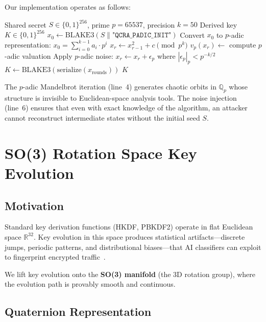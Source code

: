 \documentclass[11pt,a4paper]{article}
\begin{document}
Our implementation operates as follows:

\begin{algorithm}[H]
\caption{P-Adic Key Derivation}
\label{alg:padic}
\begin{algorithmic}[1]
\Require Shared secret $S \in \{0,1\}^{256}$, prime $p = 65537$, precision $k = 50$
\Ensure Derived key $K \in \{0,1\}^{256}$
\State $x_0 \gets \text{BLAKE3}(S \| \texttt{"QCRA\_PADIC\_INIT"})$
\State Convert $x_0$ to $p$-adic representation: $x_0 = \sum_{i=0}^{k-1} a_i \cdot p^i$
  \State $x_r \gets x_{r-1}^2 + c \pmod{p^k}$ 
  \State $v_p(x_r) \gets$ compute $p$-adic valuation
  \State Apply $p$-adic noise: $x_r \gets x_r + \epsilon_p$ where $|\epsilon_p|_p < p^{-k/2}$
\EndFor
\State $K \gets \text{BLAKE3}(\text{serialize}(x_{\text{rounds}}))$
\State \Return $K$
\end{algorithmic}
\end{algorithm}

The $p$-adic Mandelbrot iteration (line~4) generates chaotic orbits in
$\mathbb{Q}_p$ whose structure is invisible to Euclidean-space analysis
tools. The noise injection (line~6) ensures that even with exact knowledge
of the algorithm, an attacker cannot reconstruct intermediate states
without the initial seed $S$.

\section{SO(3) Rotation Space Key Evolution}
\label{sec:so3}

\subsection{Motivation}

Standard key derivation functions (HKDF, PBKDF2) operate in flat
Euclidean space $\mathbb{R}^{32}$. Key evolution in this space produces
statistical artifacts---discrete jumps, periodic patterns, and
distributional biases---that AI classifiers can exploit to fingerprint
encrypted traffic~\cite{draper2016}.

We lift key evolution onto the \textbf{SO(3) manifold} (the 3D rotation
group), where the evolution path is provably smooth and continuous.

\subsection{Quaternion Representation}
\end{document}
